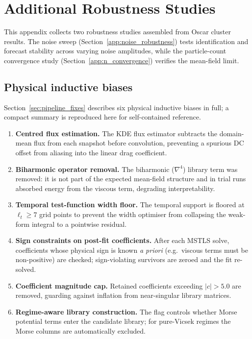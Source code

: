 \chapter{Additional Robustness Studies}
\label{app:studies_in_progress}

This appendix collects two robustness studies assembled from Oscar
cluster results.  The noise sweep
(Section~\ref{app:noise_robustness}) tests identification and forecast
stability across varying noise amplitudes, while the particle-count
convergence study (Section~\ref{app:n_convergence}) verifies the
mean-field limit.

\section{Physical inductive biases}
\label{app:pipeline_fixes}

Section~\ref{sec:pipeline_fixes} describes six physical inductive biases
in full; a compact summary is reproduced here for self-contained
reference.

\begin{enumerate}[nosep]

  \item \textbf{Centred flux estimation.}
    The KDE flux estimator subtracts the domain-mean flux from each snapshot
    before convolution, preventing a spurious DC offset from aliasing into
    the linear drag coefficient.

  \item \textbf{Biharmonic operator removal.}
    The biharmonic ($\nabla^4$) library term was removed: it is not part of
    the expected mean-field structure and in trial runs absorbed energy from
    the viscous term, degrading interpretability.

  \item \textbf{Temporal test-function width floor.}
    The temporal support is floored at $\ell_t \geq 7$ grid points to prevent
    the width optimiser from collapsing the weak-form integral to a pointwise
    residual.

  \item \textbf{Sign constraints on post-fit coefficients.}
    After each MSTLS solve, coefficients whose physical sign is known
    \emph{a priori} (e.g.\ viscous terms must be non-positive) are checked;
    sign-violating survivors are zeroed and the fit re-solved.

  \item \textbf{Coefficient magnitude cap.}
    Retained coefficients exceeding $|c|>5.0$ are removed, guarding against
    inflation from near-singular library matrices.

  \item \textbf{Regime-aware library construction.}
    The  flag controls whether Morse potential terms enter
    the candidate library; for pure-Vicsek regimes the Morse columns are
    automatically excluded.

\end{enumerate}


